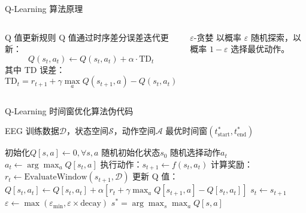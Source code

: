 {\begin{frame}{Q-Learning 算法原理}
\begin{columns}[T]
        \begin{block}{Q 值更新规则}
            \scriptsize
            Q 值通过时序差分误差迭代更新：
            \begin{equation*}
            Q(s_t, a_t) \leftarrow Q(s_t, a_t) + \alpha \cdot \text{TD}_t
            \end{equation*}
            其中 TD 误差：
            \begin{equation*}
            \text{TD}_t = r_{t+1} + \gamma \max_{a} Q(s_{t+1}, a) - Q(s_t, a_t)
            \end{equation*}
        \end{block}

        \begin{block}{$\varepsilon$-贪婪}
            \scriptsize
            以概率 $\varepsilon$ 随机探索，以概率 $1-\varepsilon$ 选择最优动作。
        \end{block}
    \end{columns}

\end{frame}

\begin{frame}{Q-Learning 时间窗优化算法伪代码}
    \begin{algorithm}[H]
    \scriptsize
    \begin{algorithmic}[1]
    \REQUIRE EEG 训练数据$\mathcal{D}$，状态空间$\mathcal{S}$，动作空间$\mathcal{A}$
    \ENSURE 最优时间窗$(t_{\text{start}}^*, t_{\text{end}}^*)$

    \STATE 初始化$Q[s, a] \leftarrow 0, \forall s, a$
        \STATE 随机初始化状态$s_0$
                \STATE 随机选择动作$a_t$
            \ELSE
                \STATE $a_t \leftarrow \arg\max_a Q[s_t, a]$
            \ENDIF
            \STATE 执行动作：$s_{t+1} \leftarrow f(s_t, a_t)$
            \STATE 计算奖励：$r_t \leftarrow \text{EvaluateWindow}(s_{t+1}, \mathcal{D})$
            \STATE 更新 Q 值：$Q[s_t, a_t] \leftarrow Q[s_t, a_t] + \alpha[r_t + \gamma\max_a Q[s_{t+1}, a] - Q[s_t, a_t]]$
            \STATE $s_t \leftarrow s_{t+1}$
        \ENDFOR
        \STATE $\varepsilon \leftarrow \max(\varepsilon_{\text{min}}, \varepsilon \times \text{decay})$
    \ENDFOR
    \STATE \RETURN $s^* = \arg\max_s \max_a Q[s, a]$
    \end{algorithmic}
    \end{algorithm}
\end{frame}

}
